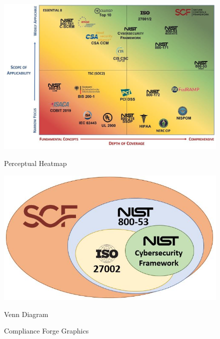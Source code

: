 \vspace*{\fill}
\begin{figure}[h!]
       \begin{minipage}[c]{0.4\linewidth}
             \centering
             \includegraphics[scale=0.5]{cybersecurity-frameworks-perception-heatmap.jpg}
             \caption{Perceptual Heatmap}
       \end{minipage}\hfill
       \begin{minipage}[c]{0.4\linewidth}
             \centering
             \includegraphics[scale=0.5]{cybersecurity-spectrum-nist-csf-vs-iso-27002-vs-nist-800-53-vs-scf.jpg}
             \caption{Venn Diagram}
       \end{minipage}
       \caption{Compliance Forge Graphics}
\end{figure}
\vspace*{\fill}

\restoregeometry
\fancyheadoffset{0pt}